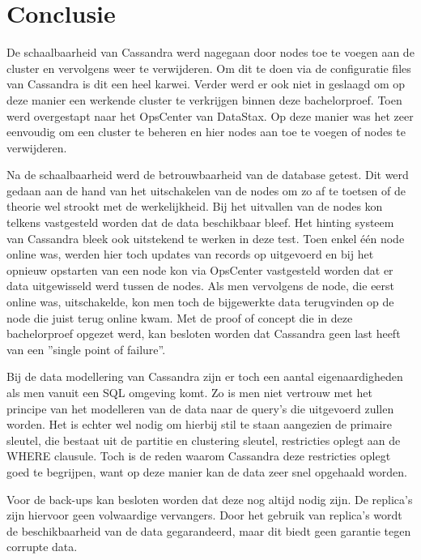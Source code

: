 \chapter{Conclusie}
\label{ch:conclusie}


De schaalbaarheid van Cassandra werd nagegaan door nodes toe te voegen aan de cluster en vervolgens weer te verwijderen.
Om dit te doen via de configuratie files van Cassandra is dit een heel karwei.
Verder werd er ook niet in geslaagd om op deze manier een werkende cluster te verkrijgen binnen deze bachelorproef.
Toen werd overgestapt naar het OpsCenter van DataStax.
Op deze manier was het zeer eenvoudig om een cluster te beheren en hier nodes aan toe te voegen of nodes te verwijderen.

Na de schaalbaarheid werd de betrouwbaarheid van de database getest.
Dit werd gedaan aan de hand van het uitschakelen van de nodes om zo af te toetsen of de theorie wel strookt met de werkelijkheid.
Bij het uitvallen van de nodes kon telkens vastgesteld worden dat de data beschikbaar bleef.
Het hinting systeem van Cassandra bleek ook uitstekend te werken in deze test.
Toen enkel één node online was, werden hier toch updates van records op uitgevoerd en bij het opnieuw opstarten van een node kon via OpsCenter vastgesteld worden dat er data uitgewisseld werd tussen de nodes.
Als men vervolgens de node, die eerst online was, uitschakelde, kon men toch de bijgewerkte data terugvinden op de node die juist terug online kwam.
Met de proof of concept die in deze bachelorproef opgezet werd, kan besloten worden dat Cassandra geen last heeft van een ''single point of failure''.

Bij de data modellering van Cassandra zijn er toch een aantal eigenaardigheden als men vanuit een SQL omgeving komt.
Zo is men niet vertrouw met het principe van het modelleren van de data naar de query's die uitgevoerd zullen worden.
Het is echter wel nodig om hierbij stil te staan aangezien de primaire sleutel, die bestaat uit de partitie en clustering sleutel, restricties oplegt aan de WHERE clausule.
Toch is de reden waarom Cassandra deze restricties oplegt goed te begrijpen, want op deze manier kan de data zeer snel opgehaald worden.

Voor de back-ups kan besloten worden dat deze nog altijd nodig zijn.
De replica's zijn hiervoor geen volwaardige vervangers.
Door het gebruik van replica's wordt de beschikbaarheid van de data gegarandeerd, maar dit biedt geen garantie tegen corrupte data.

